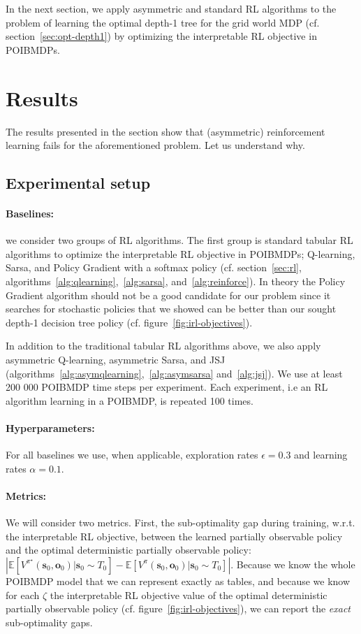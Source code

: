 In the next section, we apply asymmetric and standard RL algorithms to the problem of learning the optimal depth-1 tree for the grid world MDP (cf. section~\ref{sec:opt-depth1}) by optimizing the interpretable RL objective in POIBMDPs.

\section{Results}

The results presented in the section show that (asymmetric) reinforcement learning fails for the aforementioned problem. Let us understand why.

\subsection{Experimental setup}

\paragraph{Baselines:} we consider two groups of RL algorithms.
The first group is standard tabular RL algorithms to optimize the interpretable RL objective in POIBMDPs; Q-learning, Sarsa, and Policy Gradient with a softmax policy (cf. section~\ref{sec:rl}, algorithms~\ref{alg:qlearning},~\ref{alg:sarsa}, and~\ref{alg:reinforce}).
In theory the Policy Gradient algorithm should not be a good candidate for our problem since it searches for stochastic policies that we showed can be better than our sought depth-1 decision tree policy (cf. figure~\ref{fig:irl-objectives}).

In addition to the traditional tabular RL algorithms above, we also apply asymmetric Q-learning, asymmetric Sarsa, and JSJ (algorithms~\ref{alg:asymqlearning},~\ref{alg:asymsarsa} and~\ref{alg:jsj}).
We use at least 200 000 POIBMDP time steps per experiment. Each experiment, i.e an RL algorithm learning in a POIBMDP, is repeated 100 times.  

\paragraph{Hyperparameters:} For all baselines we use, when applicable, exploration rates $\epsilon=0.3$ and learning rates $\alpha=0.1$.

\paragraph{Metrics:} We will consider two metrics.
First, the sub-optimality gap during training, w.r.t. the interpretable RL objective, between the learned partially observable policy and the optimal deterministic partially observable policy: $|\mathbb{E}\left[V^\pi^{\star}(\boldsymbol{s}_0,\boldsymbol{o}_0)| \boldsymbol{s}_0\sim T_0\right] - \mathbb{E}\left[V^\pi(\boldsymbol{s}_0,\boldsymbol{o}_0)|\boldsymbol{s}_0\sim T_0\right]|$.
Because we know the whole POIBMDP model that we can represent exactly as tables, and because we know for each $\zeta$ the interpretable RL objective value of the optimal deterministic partially observable policy (cf. figure~\ref{fig:irl-objectives}), we can report the \textit{exact} sub-optimality gaps.

